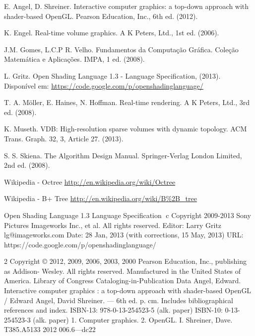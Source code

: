 \begin{thebibliography}{99}


E. Angel, D. Shreiner.  Interactive computer graphics: a top-down approach with shader-based OpenGL. Pearson Education, Inc., 6th ed. (2012).

K. Engel. Real-time volume graphics. A K Peters, Ltd., 1st ed. (2006).

J.M. Gomes, L.C.P R. Velho. Fundamentos da Computa\c{c}\~ao Gr\'afica. Cole\c{c}\~ao Matemática e Aplica\c{c}\~oes. IMPA, 1 ed. (2008).

L. Gritz. Open Shading Language 1.3 - Language Specification, (2013). Disponível em: \url{ https://code.google.com/p/openshadinglanguage/}

T. A. M\"oller, E. Haines, N. Hoffman. Real-time rendering. A K Peters, Ltd., 3rd ed. (2008).

 K. Museth. VDB: High-resolution sparse volumes with dynamic topology. ACM Trans. Graph. 32, 3, Article 27. (2013).

S. S. Skiena. The Algorithm Design Manual. Springer-Verlag London Limited, 2nd ed. (2008).

Wikipedia - Octree
\url{http://en.wikipedia.org/wiki/Octree}

Wikipedia - B+ Tree
\url{ http://en.wikipedia.org/wiki/B\%2B_tree}

\end{thebibliography}
Open Shading Language 1.3
Language Specification
⃝c Copyright 2009-2013 Sony Pictures Imageworks Inc., et al. All rights reserved.
Editor: Larry Gritz
lg@imageworks.com
Date: 28 Jan, 2013
(with corrections, 15 May, 2013)
URL: https://code.google.com/p/openshadinglanguage/

2
Copyright © 2012, 2009, 2006, 2003, 2000 Pearson Education, Inc., publishing as Addison- Wesley. All rights reserved. Manufactured in the United States of America. 
Library of Congress Cataloging-in-Publication Data
Angel, Edward.
Interactive computer graphics : a top-down approach with shader-based OpenGL /
Edward Angel, David Shreiner. — 6th ed. p. cm.
Includes bibliographical references and index.
ISBN-13: 978-0-13-254523-5 (alk. paper)
ISBN-10: 0-13-254523-3 (alk. paper)
1. Computer graphics. 2. OpenGL. I. Shreiner, Dave. T385.A5133 2012
006.6—dc22

